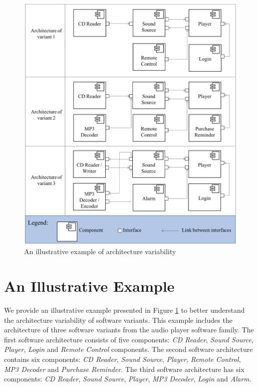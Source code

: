 \documentclass[graybox]{svmult}
\begin{document}
\begin{figure}[b!]
\centering
\includegraphics[width=\textwidth]{figs/kind_architecture_variability.png}
\caption{An illustrative example of architecture variability}
\label{fig:archVarExam1}
\end{figure}

\section{An Illustrative Example}
\label{sec:ilstrativeexample}
We provide an illustrative example presented in Figure \ref{fig:archVarExam1} to better understand the architecture variability of software variants. This example includes the architecture of three software variants from the audio player software family.
The first software architecture consists of five components: \textit{CD Reader}, \textit{Sound Source}, \textit{Player}, \textit{Login} and  \textit{Remote Control} components. The second software architecture contains six components: \textit{CD Reader}, \textit{Sound Source}, \textit{Player}, \textit{Remote Control}, \textit{MP3 Decoder} and \textit{Purchase Reminder}. The third software architecture has six components: \textit{CD Reader}, \textit{Sound Source}, \textit{Player}, \textit{MP3 Decoder}, \textit{Login} and \textit{Alarm}. 
\end{document}
